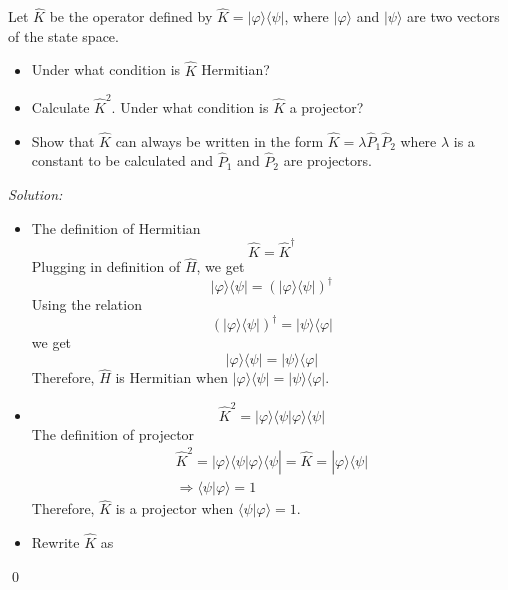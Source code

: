 \documentclass[12pt,a4paper]{article}
\newenvironment{problem}[2][Problem]{\begin{trivlist}
\item[\hskip \labelsep {\bfseries #1}\hskip \labelsep {\bfseries #2.}]}{\end{trivlist}}
\newenvironment{sol}
    {\emph{Solution:}
    }
    {
    \qed
    }
\begin{document}
\begin{problem}{2}
[C-T exercise 2-4] Let $\hat{K}$ be the operator defined by $\hat{K}=|\varphi\rangle\langle\psi|$, where $|\varphi\rangle$ and $|\psi\rangle$ are two vectors of the state space.
\begin{itemize}
\item[(a)] Under what condition is $\hat{K}$ Hermitian?
\item[(b)] Calculate $\hat{K}^2$. Under what condition is $\hat{K}$ a projector?
\item[(c)] Show that $\hat{K}$ can always be written in the form $\hat{K}=\lambda\hat{P}_1\hat{P}_2$ where $\lambda$ is a constant to be calculated and $\hat{P}_1$ and $\hat{P}_2$ are projectors.
\end{itemize}
\end{problem}
\begin{sol}
\begin{itemize}
\item[(a)] The definition of Hermitian
\begin{equation}
\hat{K}=\hat{K}^{\dagger}
\end{equation}
Plugging in definition of $\hat{H}$, we get
\begin{equation}
|\varphi\rangle\langle\psi|=(|\varphi\rangle\langle\psi|)^{\dagger}
\end{equation}
Using the relation
\begin{equation}
(|\varphi\rangle\langle\psi|)^{\dagger}=|\psi\rangle\langle\varphi|
\end{equation}
we get
\begin{equation}
|\varphi\rangle\langle\psi|=|\psi\rangle\langle\varphi|
\end{equation}
Therefore, $\hat{H}$ is Hermitian when $|\varphi\rangle\langle\psi|=|\psi\rangle\langle\varphi|$.
\item[(b)]
\begin{equation}
\hat{K}^2=|\varphi\rangle\langle\psi|\varphi\rangle\langle\psi|
\end{equation}
The definition of projector
\begin{gather}
\hat{K}^2=|\varphi\rangle\langle\psi|\varphi\rangle\langle\psi|=\hat{K}=|\varphi\rangle\langle\psi|\\
\Longrightarrow\langle\psi|\varphi\rangle=1
\end{gather}
Therefore, $\hat{K}$ is a projector when $\langle\psi|\varphi\rangle=1$.
\item[(c)] Rewrite $\hat{K}$ as
\begin{equation}

\end{equation}
\end{itemize}
\end{sol}
\end{document}

